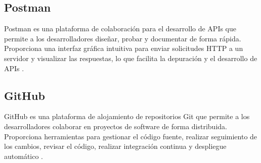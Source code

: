 \subsection{Postman}

Postman es una plataforma de colaboración para el desarrollo de APIs que
permite a los desarrolladores diseñar, probar y documentar de forma rápida.
Proporciona una interfaz gráfica intuitiva para enviar solicitudes HTTP a un
servidor y visualizar las respuestas, lo que facilita la depuración y el
desarrollo de APIs \cite{Postman}.



\subsection{GitHub}

GitHub es una plataforma de alojamiento de repositorios Git \cite{Git} que
permite a los desarrolladores colaborar en proyectos de software de forma
distribuida. Proporciona herramientas para gestionar el código fuente, realizar
seguimiento de los cambios, revisar el código, realizar integración continua y
despliegue automático \cite{Github}.

